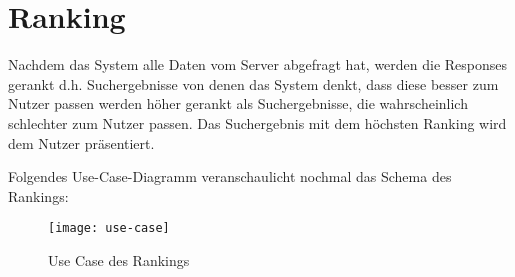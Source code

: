 \author{Lothar Mödl, Gottfried von Recum}

\section{Ranking}

Nachdem das System alle Daten vom Server abgefragt hat, werden die Responses gerankt d.h. 
Suchergebnisse von denen das System denkt, dass diese besser zum Nutzer passen werden höher 
gerankt als Suchergebnisse, die wahrscheinlich schlechter zum Nutzer passen. Das Suchergebnis mit 
dem höchsten Ranking wird dem Nutzer präsentiert.

Folgendes Use-Case-Diagramm veranschaulicht nochmal das Schema des Rankings:   

\begin{figure}[h]
	\centering
	\texttt{[image: use-case]}
	\caption{Use Case des Rankings}
	\label{fig:Ranking Use-Case}
\end{figure}
\pagebreak